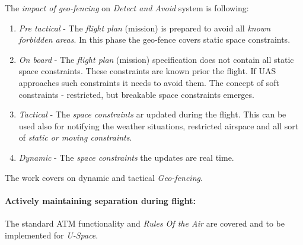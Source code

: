 \noindent The \emph{impact of geo-fencing} on \emph{Detect and Avoid} system is following:
\begin{enumerate}
    \item \emph{Pre tactical} - The \emph{flight plan} (mission) is prepared to avoid all \emph{known forbidden areas}. In this phase the geo-fence covers static space constraints.
    
    \item \emph{On board} - The \emph{flight plan} (mission) specification does not contain all static space constraints. These constraints are known prior the flight. If UAS approaches such constraints it needs to avoid them. The concept of soft constraints - restricted, but breakable space constraints emerges. 
    
    \item \emph{Tactical} - The \emph{space constraints} ar updated during the flight. This can be used also for notifying the weather situations, restricted airspace and all sort of \emph{static or moving constraints}.
    
    \item \emph{Dynamic} - The \emph{space constraints} the updates are real time.
\end{enumerate}

\begin{note}
    The work covers on dynamic and tactical \emph{Geo-fencing}.
\end{note}

\paragraph{Actively maintaining separation during flight:} The standard ATM functionality \cite{icao4444} and \emph{Rules Of the Air} \cite{icaoAnnex2,icaoAnnex11} are covered and to be implemented for \emph{U-Space}.